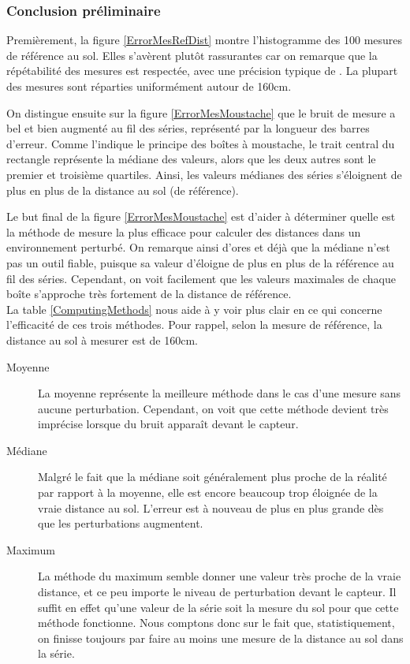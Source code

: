\subsubsection{Conclusion préliminaire} 

Premièrement, la figure \ref{ErrorMesRefDist} montre l'histogramme des 100 mesures de référence au sol.
Elles s'avèrent plutôt rassurantes car on remarque que la répétabilité des mesures est respectée, avec
une précision typique de \textpm 2cm. La plupart des mesures sont réparties uniformément autour de 160cm.\par
On distingue ensuite sur la figure \ref{ErrorMesMoustache} que le bruit de mesure a bel et bien augmenté
au fil des séries, représenté par la longueur des barres d'erreur. Comme l'indique le principe des boîtes
à moustache, le trait central du rectangle représente la médiane des valeurs, alors que les deux autres
sont le premier et troisième quartiles. Ainsi, les valeurs médianes des séries s'éloignent de plus en 
plus de la distance au sol (de référence).\par
Le but final de la figure \ref{ErrorMesMoustache} est d'aider à déterminer quelle est la méthode
de mesure la plus efficace pour calculer des distances dans un environnement perturbé. On remarque
ainsi d'ores et déjà que la médiane n'est pas un outil fiable, puisque sa valeur d'éloigne de plus en
plus de la référence au fil des séries. Cependant, on voit facilement que les valeurs maximales de chaque
boîte s'approche très fortement de la distance de référence.\\
La table \ref{ComputingMethods} nous aide à y voir plus clair en ce qui concerne l'efficacité de ces
trois méthodes. Pour rappel, selon la mesure de référence, la distance au sol à mesurer est de 160cm.

\begin{description}
    \item[Moyenne] La moyenne représente la meilleure méthode dans le cas d'une mesure sans aucune 
    perturbation. Cependant, on voit que cette méthode devient très imprécise lorsque du bruit
    apparaît devant le capteur.
    \item[Médiane] Malgré le fait que la médiane soit généralement plus proche de la réalité par rapport 
    à la moyenne, elle est encore beaucoup trop éloignée de la vraie distance au sol. L'erreur est à 
    nouveau de plus en plus grande dès que les perturbations augmentent. 
    \item[Maximum] La méthode du maximum semble donner une valeur très proche de la vraie distance,
    et ce peu importe le niveau de perturbation devant le capteur. Il suffit en effet qu'une valeur
    de la série soit la mesure du sol pour que cette méthode fonctionne. Nous comptons donc sur le fait 
    que, statistiquement, on finisse toujours par faire au moins une mesure de la distance au sol dans 
    la série.
\end{description}


